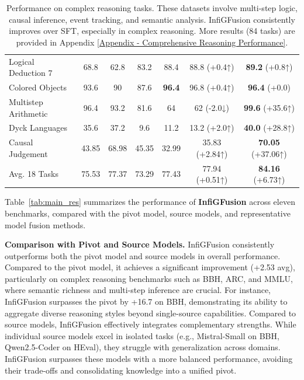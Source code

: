 \documentclass{article}
\begin{document}
\begin{table}[t]
{\begin{tabular}{lcccc>{\columncolor{blue!10}}c>{\columncolor{blue!10}}c}
Logical Deduction 7 & 68.8 & 62.8 & 83.2 & 88.4 & 88.8 {\color{blue}(+0.4↑)} & \textbf{89.2} {\color{blue}(+0.8↑)} \\
Colored Objects & 93.6 & 90 & 87.6 & \textbf{96.4} & 96.8 {\color{blue}(+0.4↑)} & \textbf{96.4} {\color{blue}(+0.0)} \\
Multistep Arithmetic & 96.4 & 93.2 & 81.6 & 64 & 62 {\color{red}(-2.0↓)} & \textbf{99.6} {\color{blue}(+35.6↑)} \\
Dyck Languages & 35.6 & 37.2 & 9.6 & 11.2 & 13.2 {\color{blue}(+2.0↑)} & \textbf{40.0} {\color{blue}(+28.8↑)} \\
Causal Judgement & 43.85 & 68.98 & 45.35 & 32.99 & 35.83 {\color{blue}(+2.84↑)} & \textbf{70.05} {\color{blue}(+37.06↑)} \\
\midrule
Avg. 18 Tasks & 75.53 & 77.37 & 73.29 & 77.43 & 77.94 {\color{blue}(+0.51↑)} & \textbf{84.16} {\color{blue}(+6.73↑)} \\
\bottomrule
\end{tabular}}
\caption{
\small Performance on complex reasoning tasks. These datasets involve multi-step logic, causal inference, event tracking, and semantic analysis. InfiGFusion consistently improves over SFT, especially in complex reasoning. More results (84 tasks) are provided in Appendix \ref{Appendix - Comprehensive Reasoning Performance}.
}
\label{tab:res2}
\vspace{-3mm}
\end{table}


Table~\ref{tab:main_res} summarizes the performance of \textbf{InfiGFusion} across eleven benchmarks, compared with the pivot model, source models, and representative model fusion methods.

\textbf{Comparison with Pivot and Source Models.}
InfiGFusion consistently outperforms both the pivot model and source models in overall performance. Compared to the pivot model, it achieves a significant improvement (+2.53 avg), particularly on complex reasoning benchmarks such as BBH, ARC, and MMLU, where semantic richness and multi-step inference are crucial. For instance, InfiGFusion surpasses the pivot by +16.7 on BBH, demonstrating its ability to aggregate diverse reasoning styles beyond single-source capabilities.
Compared to source models, InfiGFusion effectively integrates complementary strengths. While individual source models excel in isolated tasks (e.g., Mistral-Small on BBH, Qwen2.5-Coder on HEval), they struggle with generalization across domains. InfiGFusion surpasses these models with a more balanced performance, avoiding their trade-offs and consolidating knowledge into a unified pivot.
\end{document}
